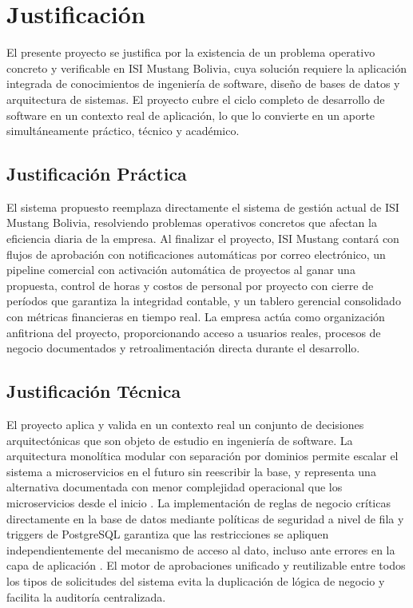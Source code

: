 \documentclass{univalle-perfil}
\begin{document}
\section{Justificación}

El presente proyecto se justifica por la existencia de un problema operativo concreto y verificable en ISI Mustang Bolivia, cuya solución requiere la aplicación integrada de conocimientos de ingeniería de software, diseño de bases de datos y arquitectura de sistemas. El proyecto cubre el ciclo completo de desarrollo de software en un contexto real de aplicación, lo que lo convierte en un aporte simultáneamente práctico, técnico y académico.

\subsection{Justificación Práctica}

El sistema propuesto reemplaza directamente el sistema de gestión actual de ISI Mustang Bolivia, resolviendo problemas operativos concretos que afectan la eficiencia diaria de la empresa. Al finalizar el proyecto, ISI Mustang contará con flujos de aprobación con notificaciones automáticas por correo electrónico, un pipeline comercial con activación automática de proyectos al ganar una propuesta, control de horas y costos de personal por proyecto con cierre de períodos que garantiza la integridad contable, y un tablero gerencial consolidado con métricas financieras en tiempo real. La empresa actúa como organización anfitriona del proyecto, proporcionando acceso a usuarios reales, procesos de negocio documentados y retroalimentación directa durante el desarrollo.

\subsection{Justificación Técnica}

El proyecto aplica y valida en un contexto real un conjunto de decisiones arquitectónicas que son objeto de estudio en ingeniería de software. La arquitectura monolítica modular con separación por dominios permite escalar el sistema a microservicios en el futuro sin reescribir la base, y representa una alternativa documentada con menor complejidad operacional que los microservicios desde el inicio \parencite{newman2021}. La implementación de reglas de negocio críticas directamente en la base de datos mediante políticas de seguridad a nivel de fila y triggers de PostgreSQL garantiza que las restricciones se apliquen independientemente del mecanismo de acceso al dato, incluso ante errores en la capa de aplicación \parencite{postgresql2024}. El motor de aprobaciones unificado y reutilizable entre todos los tipos de solicitudes del sistema evita la duplicación de lógica de negocio y facilita la auditoría centralizada.
\end{document}
